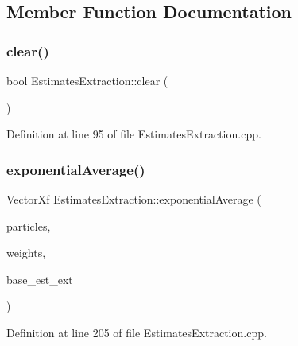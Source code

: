 \subsection{Member Function Documentation}
\mbox{\label{classbfl_1_1EstimatesExtraction_a26c432f43ff0849e54b2e9474c02d1a5}} 
\subsubsection{\texorpdfstring{clear()}{clear()}}
{\footnotesize\ttfamily bool Estimates\+Extraction\+::clear (\begin{DoxyParamCaption}{ }\end{DoxyParamCaption})}



Definition at line 95 of file Estimates\+Extraction.\+cpp.

\mbox{\label{classbfl_1_1EstimatesExtraction_aef99ef75c04aa871ab9286442f2d7535}} 
\subsubsection{\texorpdfstring{exponential\+Average()}{exponentialAverage()}}
{\footnotesize\ttfamily Vector\+Xf Estimates\+Extraction\+::exponential\+Average (\begin{DoxyParamCaption}\item[{const Eigen\+::\+Ref$<$ const Eigen\+::\+Matrix\+Xf $>$ \&}]{particles,  }\item[{const Eigen\+::\+Ref$<$ const Eigen\+::\+Vector\+Xf $>$ \&}]{weights,  }\item[{const \mbox{\hyperlink{classbfl_1_1EstimatesExtraction_a8c0593a43166c569530947107c830462}{Statistics}} \&}]{base\+\_\+est\+\_\+ext }\end{DoxyParamCaption})\hspace{0.3cm}{\ttfamily [protected]}}



Definition at line 205 of file Estimates\+Extraction.\+cpp.

